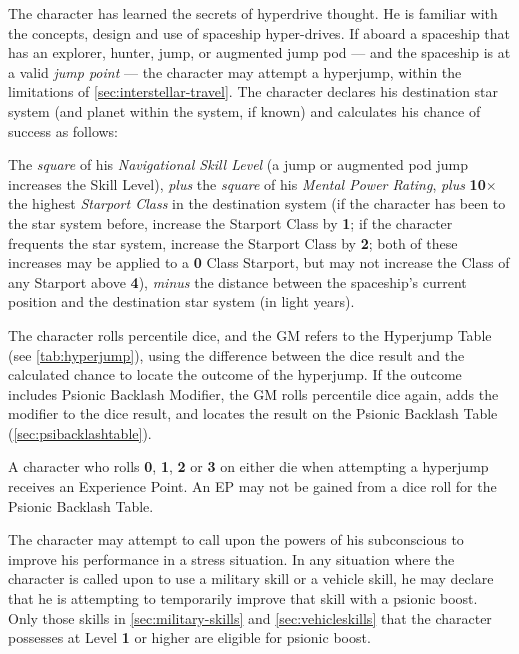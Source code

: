 \label{sec:skill-navigation}

The character has learned the secrets of hyperdrive thought.  He is
familiar with the concepts, design and use of spaceship hyper-drives.
If aboard a spaceship that has an explorer, hunter, jump, or augmented
jump pod --- and the spaceship is at a valid \emph{jump point} --- the
character may attempt a hyperjump, within the limitations of
\ref{sec:interstellar-travel}.  The character declares his destination
star system (and planet within the system, if known) and calculates
his chance of success as follows:

The \emph{square} of his \emph{Navigational Skill Level} (a jump or
augmented pod jump increases the Skill Level), \emph{plus} the
\emph{square} of his \emph{Mental Power Rating}, \emph{plus}
\textbf{10$\times$} the highest \emph{Starport Class} in the
destination system (if the character has been to the star system
before, increase the Starport Class by \textbf{1}; if the character
frequents the star system, increase the Starport Class by \textbf{2};
both of these increases may be applied to a \textbf{0} Class Starport,
but may not increase the Class of any Starport above \textbf{4}),
\emph{minus} the distance between the spaceship's current position and
the destination star system (in light years).

The character rolls percentile dice, and the GM refers to the
Hyperjump Table (see \ref{tab:hyperjump}), using the difference
between the dice result and the calculated chance to locate the
outcome of the hyperjump.  If the outcome includes Psionic Backlash
Modifier, the GM rolls percentile dice again, adds the modifier to the
dice result, and locates the result on the Psionic Backlash Table
(\ref{sec:psibacklashtable}).

A character who rolls \textbf{0}, \textbf{1}, \textbf{2} or \textbf{3}
on either die when attempting a hyperjump receives an Experience
Point.  An EP may not be gained from a dice roll for the Psionic
Backlash Table.

\label{sec:skill-psionic-boost}

The character may attempt to call upon the powers of his subconscious
to improve his performance in a stress situation.  In any situation
where the character is called upon to use a military skill or a
vehicle skill, he may declare that he is attempting to temporarily
improve that skill with a psionic boost.  Only those skills in
\ref{sec:military-skills} and \ref{sec:vehicleskills} that the
character possesses at Level \textbf{1} or higher are eligible for
psionic boost.

